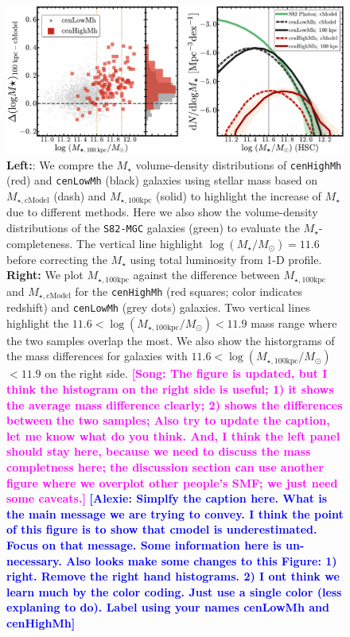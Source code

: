 \documentclass{emulateapj}
\def\rbcg{\texttt{cenHighMh}}
\def\nbcg{\texttt{cenLowMh}}
\def\mstar{{$M_{\star}$}}
\def\logms{{$\log (M_{\star}/M_{\odot})$}}
\def\mtot{{$M_{\star,100\mathrm{kpc}}$}}
\def\mcmodel{{$M_{\star,\mathrm{cModel}}$}}
\def\logmtot{{$\log (M_{\star,100\mathrm{kpc}}/M_{\odot})$}}
\newcommand{\song}[1]{\textcolor{magenta}{\textbf{[Song: #1]}}}
\newcommand{\alexie}[1]{\textcolor{blue}{\textbf{[Alexie: #1]}}}
\begin{document}
\begin{CJK*}{UTF8}{gbsn}
  \begin{figure}[bt!]
      \centering 
      \includegraphics[width=\textwidth]{fig/redbcg_smf_new}
      \caption{\textbf{Left:}: We compre the \mstar{} volume-density distributions of 
      	  \rbcg{} (red) and \nbcg{} (black) galaxies using stellar mass based on 
          \mcmodel{} (dash) and \mtot{} (solid) to highlight the increase of \mstar{}
          due to different methods.  
          Here we also show the volume-density distributions of the \texttt{S82-MGC} 
          galaxies (green) to evaluate the \mstar{}-completeness. 
          The vertical line highlight \logms{}$=11.6$ before correcting the \mstar{} using
          total luminosity from 1-D profile.~~
          \textbf{Right:} We plot \mtot{} against the difference between \mtot{} and 
          \mcmodel{} for the \rbcg{} (red squares; color indicates redshift) and \nbcg{}
          (grey dots) galaxies. 
          Two vertical lines highlight the $11.6<$\logmtot{}$<11.9$ mass range where the
          two samples overlap the most.
          We also show the historgrams of the mass differences for galaxies with 
          $11.6<$\logmtot{}$<11.9$ on the right side. 
          \song{The figure is updated, but I think the histogram on the right side is 
          useful; 1) it shows the average mass difference clearly; 2) shows the differences
          between the two samples; Also try to update the caption, let me know what do you 
          think. And, I think the left panel should stay here, because we need to discuss 
          the mass completness here; the discussion section can use another figure where 
          we overplot other people's SMF; we just need some caveats.}
          \alexie{Simplfy the caption here. What is the main message we are trying to convey. 
          I think the point of this figure is to show that cmodel is underestimated. 
          Focus on that message. Some information here is un-necessary. 
          Also looks make some changes to this Figure: 1) right. Remove the right hand 
          histograms. 2) I ont think we learn much by the color coding. Just use a single 
          color (less explaning to do). Label using your names cenLowMh and cenHighMh}}
      \label{fig:smf1}
  \end{figure}
 

\end{CJK*}
\end{document}
